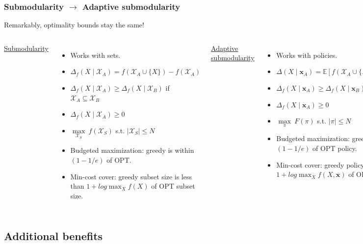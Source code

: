 \documentclass[handout]{beamer}
\begin{document}
\begin{frame}\frametitle{Submodularity $\rightarrow$ Adaptive submodularity}
Remarkably, optimality bounds stay the same!
\vspace{2em}

\begin{columns}[c]
\centering
\underline{Submodularity}
\tiny{
\begin{itemize}
    \item Works with sets.
    \item $\Delta_f(X \mid \mathcal{X}_A) = f(\mathcal{X}_A \cup \{X\}) - f(\mathcal{X}_A)$
    \item $\Delta_f(X \mid \mathcal{X}_A) \geq \Delta_f(X \mid \mathcal{X}_B)$ if $\mathcal{X}_A \subseteq \mathcal{X}_B$
    \item $\Delta_f(X \mid \mathcal{X}_A) \geq 0$
    \item $\underset{\mathcal{X}_S}{\max}\ f(\mathcal{X}_S)$ s.t. $|\mathcal{X}_S| \leq N$
    \item Budgeted maximization: greedy is within $(1 - 1/e)$ of OPT.
    \item Min-cost cover: greedy subset size is less than $1 + log \max_X f(X)$ of OPT subset size.
\end{itemize}
}

\centering
\underline{Adaptive submodularity}
\tiny{
\begin{itemize}
    \item Works with policies.
    \item $\Delta(X \mid \mathbf{x}_A) = \mathbb{E}\left[ f(\mathcal{X}_A \cup \{X\}, \mathbf{x}) - f(\mathcal{X}_A, \mathbf{x}) \mid \mathbf{x}_A \right]$
    \item $\Delta_f(X \mid \mathbf{x}_A) \geq \Delta_f(X \mid \mathbf{x}_B)$ if $\mathbf{x}_A \preceq \mathbf{x}_B$
    \item $\Delta_f(X \mid \mathbf{x}_A) \geq 0$
    \item $\underset{\pi}{\max}\ F(\pi)$  s.t. $|\pi| \leq N$
    \item Budgeted maximization: greedy policy is within $(1 - 1/e)$ of OPT policy.
    \item Min-cost cover: greedy policy size is less than $1 + log \max_X f(X,
    \mathbf{x})$ of OPT policy size.
\end{itemize}
}
\end{columns}
\end{frame}

\subsection{Additional benefits}
\end{document}
